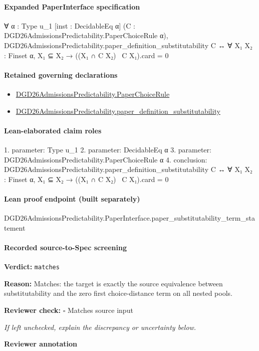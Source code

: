 \documentclass[10pt]{article}
\newcommand{\reviewerbox}{%
  \par\noindent\fbox{\parbox{0.96\linewidth}{\rule{0pt}{0.38in}}}\par
}
\newcommand{\reviewmatch}[1]{%
  \par\noindent\textbf{Reviewer check:} $\square$\; #1\par
  \noindent\emph{If left unchecked, explain the discrepancy or uncertainty below.}\par
}
\begin{document}
\paragraph{Expanded PaperInterface specification}
\begin{ReviewVerbatim}
∀ {α : Type u_1} [inst : DecidableEq α] (C : DGD26AdmissionsPredictability.PaperChoiceRule α),
  DGD26AdmissionsPredictability.paper_definition_substitutability C ↔
    ∀ {X₁ X₂ : Finset α}, X₁ ⊆ X₂ → ((X₁ ∩ C X₂) \ C X₁).card = 0
\end{ReviewVerbatim}

\paragraph{Retained governing declarations}
\begin{itemize}\raggedright
\item \hyperlink{governing-declaration-4678951b4432b184}{DGD26\allowbreak{}Admissions\allowbreak{}Predictability.\allowbreak{}Paper\allowbreak{}Choice\allowbreak{}Rule}
\item \hyperlink{governing-declaration-39cdd64a379d386b}{DGD26\allowbreak{}Admissions\allowbreak{}Predictability.\allowbreak{}paper\_\allowbreak{}definition\_\allowbreak{}substitutability}
\end{itemize}
\paragraph{Lean-elaborated claim roles}\begin{ReviewVerbatim}
1. parameter: Type u_1
2. parameter: DecidableEq α
3. parameter: DGD26AdmissionsPredictability.PaperChoiceRule α
4. conclusion: DGD26AdmissionsPredictability.paper_definition_substitutability C ↔
  ∀ {X₁ X₂ : Finset α}, X₁ ⊆ X₂ → ((X₁ ∩ C X₂) \ C X₁).card = 0
\end{ReviewVerbatim}

\paragraph{Lean proof endpoint (built separately)}\begin{ReviewVerbatim}
DGD26AdmissionsPredictability.PaperInterface.paper_substitutability_term_statement
\end{ReviewVerbatim}

\paragraph{Recorded source-to-Spec screening}
\textbf{Verdict:} \texttt{matches}
\\
{\raggedright
\textbf{Reason:} Matches:\allowbreak{} the target is exactly the source equivalence between substitutability and the zero first choice-\allowbreak{}distance term on all nested pools.\allowbreak{}
\par}
\reviewmatch{Matches source input}
\noindent\textbf{Reviewer annotation}\par
\reviewerbox
\clearpage
\hypertarget{source-claim-ca2a099855204aca}{}
\end{document}
